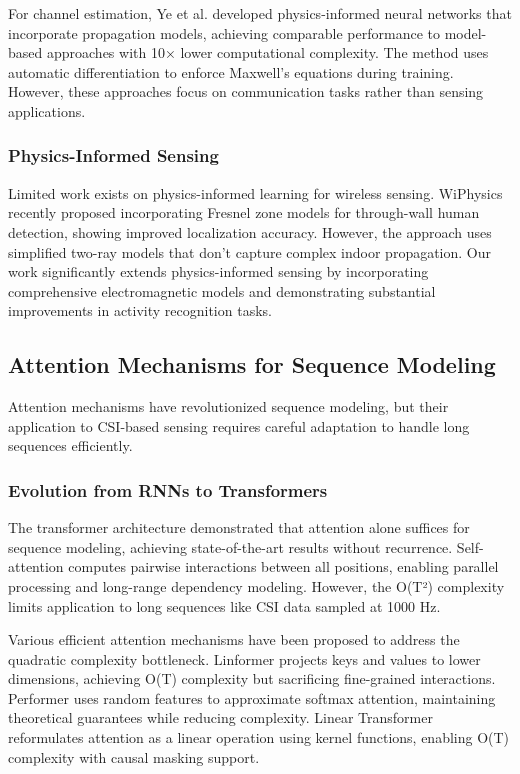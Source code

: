 \documentclass[10pt,journal,compsoc]{IEEEtran}
\begin{document}
For channel estimation, Ye et al. \cite{ye2020channel} developed physics-informed neural networks that incorporate propagation models, achieving comparable performance to model-based approaches with 10× lower computational complexity. The method uses automatic differentiation to enforce Maxwell's equations during training. However, these approaches focus on communication tasks rather than sensing applications.

\subsubsection{Physics-Informed Sensing}

Limited work exists on physics-informed learning for wireless sensing. WiPhysics \cite{wiphysics2023} recently proposed incorporating Fresnel zone models for through-wall human detection, showing improved localization accuracy. However, the approach uses simplified two-ray models that don't capture complex indoor propagation. Our work significantly extends physics-informed sensing by incorporating comprehensive electromagnetic models and demonstrating substantial improvements in activity recognition tasks.

\subsection{Attention Mechanisms for Sequence Modeling}

Attention mechanisms have revolutionized sequence modeling, but their application to CSI-based sensing requires careful adaptation to handle long sequences efficiently.

\subsubsection{Evolution from RNNs to Transformers}

The transformer architecture \cite{vaswani2017attention} demonstrated that attention alone suffices for sequence modeling, achieving state-of-the-art results without recurrence. Self-attention computes pairwise interactions between all positions, enabling parallel processing and long-range dependency modeling. However, the O(T²) complexity limits application to long sequences like CSI data sampled at 1000 Hz.

Various efficient attention mechanisms have been proposed to address the quadratic complexity bottleneck. Linformer \cite{wang2020linformer} projects keys and values to lower dimensions, achieving O(T) complexity but sacrificing fine-grained interactions. Performer \cite{choromanski2021performer} uses random features to approximate softmax attention, maintaining theoretical guarantees while reducing complexity. Linear Transformer \cite{katharopoulos2020transformers} reformulates attention as a linear operation using kernel functions, enabling O(T) complexity with causal masking support.
\end{document}
